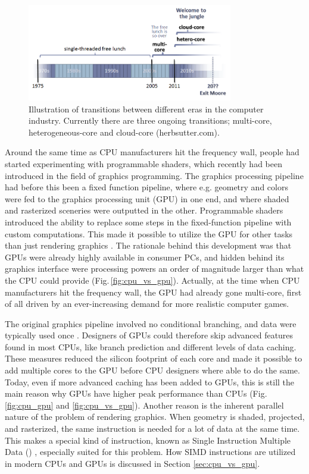\begin{figure}
\centering
\includegraphics[width=0.8\textwidth]{img/free_lunsh.png}
\caption{Illustration of transitions between different eras in the computer industry. Currently there are three ongoing transitions; multi-core, heterogeneous-core and cloud-core (herbsutter.com).}
\label{fig:jungle}
\end{figure}

Around the same time as CPU manufacturers hit the frequency wall, people had started experimenting with programmable shaders, which recently had been introduced in the field of graphics programming. The graphics processing pipeline had before this been a fixed function pipeline, where e.g. geometry and colors were fed to the graphics processing unit (GPU) in one end, and where shaded and rasterized sceneries were outputted in the other. Programmable shaders introduced the ability to replace some steps in the fixed-function pipeline with custom computations. This made it possible to utilize the GPU for other tasks than just rendering graphics \cite{Seland2007}. The rationale behind this development was that GPUs were already highly available in consumer PCs, and hidden behind its graphics interface were processing powers an order of magnitude larger than what the CPU could provide (Fig.\,\ref{fig:cpu_vs_gpu}). Actually, at the time when CPU manufacturers hit the frequency wall, the GPU had already gone multi-core, first of all driven by an ever-increasing demand for more realistic computer games. 

The original graphics pipeline involved no conditional branching, and data were typically used once \cite{Purcell2002}. Designers of GPUs could therefore skip advanced features found in most CPUs, like branch prediction and different levels of data caching. These measures reduced the silicon footprint of each core and made it possible to add multiple cores to the GPU before CPU designers where able to do the same. Today, even if more advanced caching has been added to GPUs, this is still the main reason why GPUs have higher peak performance than CPUs (Fig.\,\ref{fig:cpu_gpu} and \ref{fig:cpu_vs_gpu}). Another reason is the inherent parallel nature of the problem of rendering graphics. When geometry is shaded, projected, and rasterized, the same instruction is needed for a lot of data at the same time. This makes a special kind of instruction, known as Single Instruction Multiple Data () \cite{Flynn1966}, especially suited for this problem. How SIMD instructions are utilized in modern CPUs and GPUs is discussed in Section \ref{sec:cpu_vs_gpu}.

